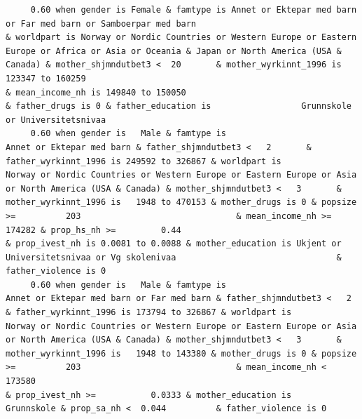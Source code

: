 \documentclass[
  letterpaper,
  DIV=11,
  numbers=noendperiod]{scrreprt}
\begin{document}
\begin{verbatim}
     0.60 when gender is Female & famtype is Annet or Ektepar med barn or Far med barn or Samboerpar med barn                                                                              & worldpart is Norway or Nordic Countries or Western Europe or Eastern Europe or Africa or Asia or Oceania & Japan or North America (USA & Canada) & mother_shjmndutbet3 <  20       & mother_wyrkinnt_1996 is 123347 to 160259                                                                             & mean_income_nh is 149840 to 150050                                                                                                                                                                                                                              & father_drugs is 0 & father_education is                  Grunnskole or Universitetsnivaa                    
     0.60 when gender is   Male & famtype is                                        Annet or Ektepar med barn & father_shjmndutbet3 <   2       & father_wyrkinnt_1996 is 249592 to 326867 & worldpart is                              Norway or Nordic Countries or Western Europe or Eastern Europe or Asia or North America (USA & Canada) & mother_shjmndutbet3 <   3       & mother_wyrkinnt_1996 is   1948 to 470153 & mother_drugs is 0 & popsize >=          203                               & mean_income_nh >=           174282 & prop_hs_nh >=         0.44                                    & prop_ivest_nh is 0.0081 to 0.0088 & mother_education is Ukjent or Universitetsnivaa or Vg skolenivaa                                & father_violence is 0                                                                                                               
     0.60 when gender is   Male & famtype is                        Annet or Ektepar med barn or Far med barn & father_shjmndutbet3 <   2       & father_wyrkinnt_1996 is 173794 to 326867 & worldpart is                              Norway or Nordic Countries or Western Europe or Eastern Europe or Asia or North America (USA & Canada) & mother_shjmndutbet3 <   3       & mother_wyrkinnt_1996 is   1948 to 143380 & mother_drugs is 0 & popsize >=          203                               & mean_income_nh <  173580                                                                           & prop_ivest_nh >=           0.0333 & mother_education is                                   Grunnskole & prop_sa_nh <  0.044          & father_violence is 0                                                                                                               

\end{verbatim}
\end{document}
